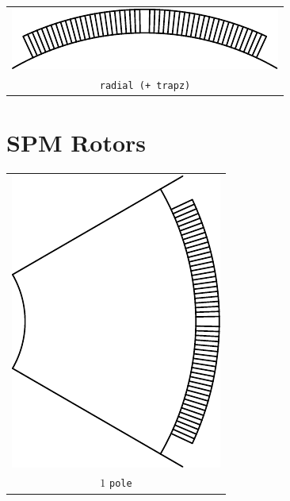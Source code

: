 \documentclass[a4paper,11pt,oneside,fleqn,titlepage]{report}
\begin{document}
\noindent
\begin{tabular}{c}
\includegraphics[scale=1]{../examples/magnets/radial_trapz}
\\
\texttt{radial (+ trapz)}
\end{tabular}




\newpage
\section{SPM Rotors}
\begin{tabular}{c}
\includegraphics[scale=0.75]{../examples/rotors/1pole} 
\\
$ 1 $ \texttt{pole}
\end{tabular}
\vspace{5mm}
\end{document}
